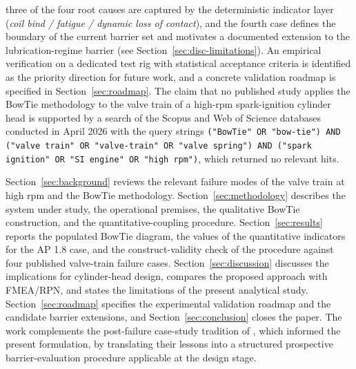 three of the four root causes are captured by the deterministic
indicator layer (\textit{coil bind / fatigue / dynamic loss of
contact}), and the fourth case \citep{zhao2023camshaftV6} defines
the boundary of the current barrier set and motivates a documented
extension to the lubrication-regime barrier (see
Section~\ref{sec:disc-limitations}). An empirical verification on a
dedicated test rig with statistical acceptance criteria is
identified as the priority direction for future work, and a concrete
validation roadmap is specified in Section~\ref{sec:roadmap}. The
claim that no published study applies the BowTie methodology to the
valve train of a high-rpm spark-ignition cylinder head is supported
by a search of the Scopus and Web of Science databases conducted in
April 2026 with the query strings
\texttt{("BowTie" OR "bow-tie") AND ("valve train" OR "valve-train" OR "valve spring") AND ("spark ignition" OR "SI engine" OR "high rpm")},
which returned no relevant hits.

Section~\ref{sec:background} reviews the relevant failure modes of the
valve train at high rpm and the BowTie methodology.
Section~\ref{sec:methodology} describes the system under study, the
operational premises, the qualitative BowTie construction, and the
quantitative-coupling procedure. Section~\ref{sec:results} reports the
populated BowTie diagram, the values of the quantitative indicators
for the AP 1.8 case, and the construct-validity check of the procedure
against four published valve-train failure cases.
Section~\ref{sec:discussion} discusses the implications for
cylinder-head design, compares the proposed approach with FMEA/RPN,
and states the limitations of the present analytical study.
Section~\ref{sec:roadmap} specifies the experimental validation
roadmap and the candidate barrier extensions, and
Section~\ref{sec:conclusion} closes the paper. The work complements the
post-failure case-study tradition of
\citet{velezgodino2019overheadvalvetrain,soffritti2018wornvalvetrain,xing2021valvespringEAC,zhao2023camshaftV6},
which informed the present formulation, by translating their lessons
into a structured prospective barrier-evaluation procedure applicable
at the design stage.
